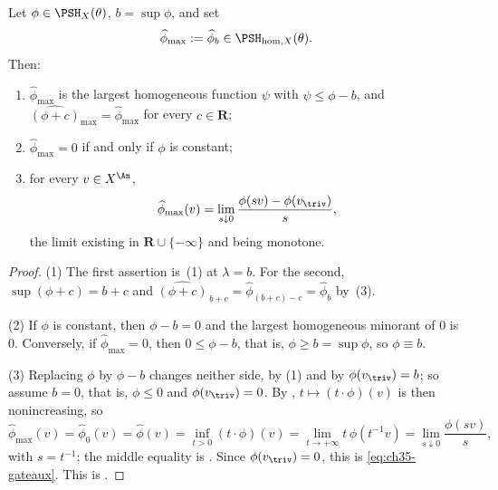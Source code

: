 \begin{proposition}
\label{prop:ch35-phimax}
Let $\phi\in\PSH_X(\theta)$, $b=\sup\phi$, and set
\begin{equation}
\label{eq:ch35-phimax}
 \widehat\phi_{\max}:=\widehat\phi_b\in\PSH_{\mathrm{hom},X}(\theta).
\end{equation}
Then:
\begin{enumerate}
\item $\widehat\phi_{\max}$ is the largest homogeneous function
 $\psi$ with $\psi\leq\phi-b$, and
 $\widehat{(\phi+c)}_{\max}=\widehat\phi_{\max}$ for every
 $c\in\mathbf R$;
\item $\widehat\phi_{\max}=0$ if and only if $\phi$ is constant;
\item for every $v\in X^{\An}$,
\begin{equation}
\label{eq:ch35-gateaux}
 \widehat\phi_{\max}(v)
 =\lim_{s\downarrow0}\frac{\phi(sv)-\phi(v_{\triv})}{s},
\end{equation}
the limit existing in $\mathbf R\cup\{-\infty\}$ and being monotone.
\end{enumerate}
\par
\end{proposition}

\begin{proof}
(1)  The first assertion is \,(1) at
$\lambda=b$.  For the second,
$\sup(\phi+c)=b+c$ and
$\widehat{(\phi+c)}_{\,b+c}=\widehat\phi_{(b+c)-c}=\widehat\phi_b$ by
\,(3).

(2)  If $\phi$ is constant, then $\phi-b=0$ and the largest homogeneous
minorant of $0$ is $0$.  Conversely, if
$\widehat\phi_{\max}=0$, then $0\leq\phi-b$, that is,
$\phi\geq b=\sup\phi$, so $\phi\equiv b$.

(3)  Replacing $\phi$ by $\phi-b$ changes neither side, by (1) and by
$\phi(v_{\triv})=b$; so assume $b=0$, that is,
$\phi\leq0$ and $\phi(v_{\triv})=0$.  By
, $t\mapsto(t\cdot\phi)(v)$ is then
nonincreasing, so
\[
 \widehat\phi_{\max}(v)=\widehat\phi_0(v)=\widehat\phi(v)
 =\inf_{t>0}(t\cdot\phi)(v)=\lim_{t\to+\infty}t\,\phi(t^{-1}v)
 =\lim_{s\downarrow0}\frac{\phi(sv)}{s},
\]
with $s=t^{-1}$; the middle equality is
.  Since $\phi(v_{\triv})=0$, this is
\eqref{eq:ch35-gateaux}.  This is \cite[Lemma~6.29]{BJ22}.
\end{proof}

